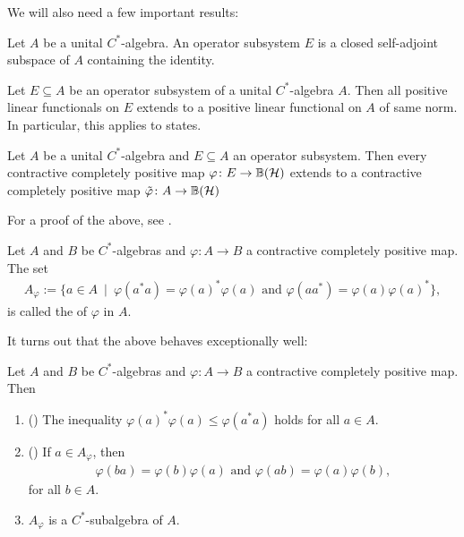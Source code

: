 We will also need a few important results:
\begin{defnonum}
	Let $A$ be a unital $C^*$-algebra. An operator subsystem $E$ is a closed self-adjoint subspace of $A$ containing the identity.
\end{defnonum}
\begin{lemnonum}
Let $E \subseteq A$ be an operator subsystem of a unital $C^*$-algebra $A$. Then all positive linear functionals on $E$ extends to a positive linear functional on $A$ of same norm. In particular, this applies to states.
\end{lemnonum}
\begin{thmnonum}
	Let $A$ be a unital $C^*$-algebra and $E \subseteq A$ an operator subsystem. Then every contractive completely positive map $\varphi \colon E \to \mathbb{B}(\mathcal{H})$ extends to a contractive completely positive map $\tilde \varphi \colon A \to \mathbb{B}(\mathcal{H})$
\end{thmnonum}
For a proof of the above, see \cite[Theorem 1.6.1]{brown2008c}.
\begin{defnonum}
	Let $A$ and $B$ be $C^*$-algebras and $\varphi \colon A \to B$ a contractive completely positive map. The set
	\begin{align*}
		A_\varphi := \{a \in A \ \mid \ \varphi(a^*a)=\varphi(a)^*\varphi(a) \text{ and } \varphi(a a^*) = \varphi(a) \varphi(a)^*\},
	\end{align*}
	is called the  of $\varphi$ in $A$.
\end{defnonum}
It turns out that the above behaves exceptionally well:
\begin{propnonum}	
	Let $A$ and $B$ be $C^*$-algebras and $\varphi \colon A \to B$ a contractive completely positive map. Then
	\begin{enumerate}
		\item () The inequality $\varphi(a)^*\varphi(a) \leq \varphi(a^*a)$ holds for all $a \in A$.
		\item() If $a \in A_\varphi$, then
			\begin{align*}
				\varphi(ba)=\varphi(b)\varphi(a) \text{ and } \varphi(ab)=\varphi(a)\varphi(b),
			\end{align*}
			for all $b \in A$.
		\item $A_\varphi$ is a $C^*$-subalgebra of $A$.
	\end{enumerate}
\end{propnonum}
